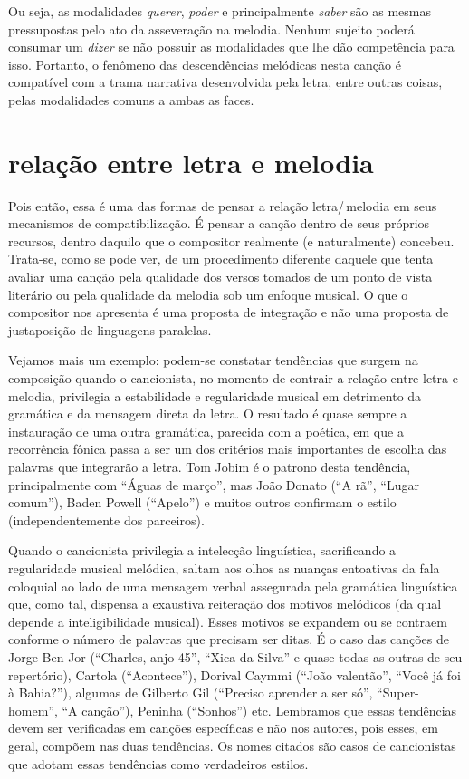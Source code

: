 
Ou seja, as modalidades \textit{querer}, \textit{poder} e principalmente \textit{saber}
são as mesmas pressupostas pelo ato da asseveração na melodia. Nenhum
sujeito poderá consumar um \textit{dizer} se não possuir as modalidades que
lhe dão competência para isso. Portanto, o fenômeno das descendências
melódicas nesta canção é compatível com a trama narrativa desenvolvida
pela letra, entre outras coisas, pelas modalidades comuns a ambas as
faces.

\section{relação entre letra e melodia}

Pois então, essa é uma das formas de pensar a relação letra/\,melodia em
seus mecanismos de compatibilização. É pensar a canção dentro de seus
próprios recursos, dentro daquilo que o compositor realmente (e
naturalmente) concebeu. Trata-se, como se pode ver, de um procedimento
diferente daquele que tenta avaliar uma canção pela qualidade dos versos
tomados de um ponto de vista literário ou pela qualidade da melodia sob
um enfoque musical. O que o compositor nos apresenta é uma proposta de
integração e não uma proposta de justaposição de linguagens paralelas.

Vejamos mais um exemplo: podem-se constatar tendências que surgem na
composição quando o cancionista, no momento de contrair a relação entre
letra e melodia, privilegia a estabilidade e regularidade musical em
detrimento da gramática e da mensagem direta da letra. O resultado é
quase sempre a instauração de uma outra gramática, parecida com a
poética, em que a recorrência fônica passa a ser um dos critérios mais
importantes de escolha das palavras que integrarão a letra. Tom Jobim é
o patrono desta tendência, principalmente com ``Águas de março'', mas João
Donato (``A rã'', ``Lugar comum''), Baden Powell (``Apelo'') e muitos outros
confirmam o estilo (independentemente dos parceiros).

Quando o cancionista privilegia a intelecção linguística, sacrificando a
regularidade musical melódica, saltam aos olhos as nuanças entoativas da
fala coloquial ao lado de uma mensagem verbal assegurada pela gramática
linguística que, como tal, dispensa a exaustiva reiteração dos motivos
melódicos (da qual depende a inteligibilidade musical). Esses motivos se
expandem ou se contraem conforme o número de palavras que precisam ser
ditas. É o caso das canções de Jorge Ben Jor (``Charles, anjo 45'', ``Xica da
Silva'' e quase todas as outras de seu repertório), Cartola (``Acontece''),
Dorival Caymmi (``João valentão'', ``Você já foi à Bahia?''), algumas de
Gilberto Gil (``Preciso aprender a ser só'', ``Super-homem'', ``A canção''),
Peninha (``Sonhos'') etc. Lembramos que essas tendências devem ser
verificadas em canções específicas e não nos autores, pois esses, em
geral, compõem nas duas tendências. Os nomes citados são casos de
cancionistas que adotam essas tendências como verdadeiros estilos.

